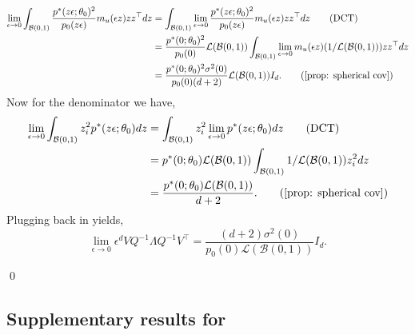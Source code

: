 \documentclass[11pt]{article}
\begin{document}
\begin{align*}
    \lim_{\epsilon \rightarrow 0} \int_{\mathcal{B}(0, 1)} \frac{p^*(z\epsilon; \theta_0)^2}{p_0(z\epsilon)}m_u(\epsilon z)zz^{\top} dz &= \int_{\mathcal{B}(0, 1)} \lim_{\epsilon \rightarrow 0}\frac{p^*(z\epsilon; \theta_0)^2}{p_0(z\epsilon)}m_u(\epsilon z)zz^{\top} dz \tag{DCT} \\
    &= \frac{p^*(0; \theta_0)^2}{p_0(0)} \mathcal{L}(\mathcal{B}(0, 1))\int_{\mathcal{B}(0, 1)} \lim_{\epsilon \rightarrow 0}m_u(\epsilon z)(1/\mathcal{L}(\mathcal{B}(0, 1)))zz^{\top} dz \\
    &= \frac{p^*(0; \theta_0)^2\sigma^2(0)}{p_0(0)(d+2)} \mathcal{L}(\mathcal{B}(0, 1))I_d. \tag{\Cref{prop: spherical cov}}
\end{align*}
Now for the denominator we have,
\begin{align*}
    \lim_{\epsilon \rightarrow 0}\int_{\mathcal{B}(0, 1)}z_i^2p^*(z\epsilon; \theta_0) dz &= \int_{\mathcal{B}(0, 1)}z_i^2\lim_{\epsilon \rightarrow 0}p^*(z\epsilon; \theta_0) dz \tag{DCT} \\
    &= p^*(0; \theta_0)\mathcal{L}(\mathcal{B}(0,1))\int_{\mathcal{B}(0, 1)}1/\mathcal{L}(\mathcal{B}(0,1))z_i^2 dz \\
    &= \frac{p^*(0; \theta_0)\mathcal{L}(\mathcal{B}(0,1))}{d+2}. \tag{\Cref{prop: spherical cov}}
\end{align*}
Plugging back in yields,
\[\lim_{\epsilon \rightarrow 0}\epsilon^dVQ^{-1}\Lambda Q^{-1}V^{\top} = \frac{(d+2)\sigma^2(0)}{p_0(0)\mathcal{L}(\mathcal{B}(0,1))}I_d.\]

\qed{}

\subsection{Supplementary results for }
\end{document}
